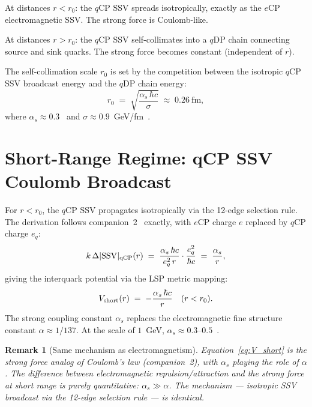 \documentclass[12pt]{article}
\newtheorem{remark}[theorem]{Remark}
\newcommand{\SSV}{\mathrm{SSV}}
\newcommand{\eCP}{e\mathrm{CP}}
\newcommand{\qCP}{q\mathrm{CP}}
\newcommand{\qDP}{q\mathrm{DP}}
\newcommand{\as}{\alpha_s}
\begin{document}
At distances $r < r_0$: the $\qCP$ SSV spreads isotropically,
exactly as the $\eCP$ electromagnetic SSV. The strong force is
Coulomb-like.

At distances $r > r_0$: the $\qCP$ SSV self-collimates into a
$\qDP$ chain connecting source and sink quarks. The strong force
becomes constant (independent of $r$).

The self-collimation scale $r_0$ is set by the competition between
the isotropic $\qCP$ SSV broadcast energy and the $\qDP$ chain
energy:
\begin{equation}
r_0 \;=\; \sqrt{\frac{\as\,\hbar c}{\sigma}}
\;\approx\; 0.26\ \mathrm{fm},
\label{eq:r0}
\end{equation}
where $\as \approx 0.3$~\cite{pdg2022} and $\sigma \approx 0.9$~GeV/fm~\cite{bali2001}.

\section{Short-Range Regime: qCP SSV Coulomb Broadcast}
\label{sec:short}

For $r < r_0$, the $\qCP$ SSV propagates isotropically via the
12-edge selection rule. The derivation follows companion~2~\cite{c2}
exactly, with $\eCP$ charge $e$ replaced by $\qCP$ charge $e_q$:
\begin{equation}
k\,\Delta|\SSV|_{\rm qCP}(r) \;=\; \frac{\as\,\hbar c}{e_q^2\,r}
\cdot \frac{e_q^2}{\hbar c}
\;=\; \frac{\as}{r},
\label{eq:ssv_short}
\end{equation}
giving the interquark potential via the LSP metric mapping:
\begin{equation}
V_{\rm short}(r) \;=\; -\frac{\as\,\hbar c}{r}
\quad (r < r_0).
\label{eq:V_short}
\end{equation}
The strong coupling constant $\as$ replaces the electromagnetic
fine structure constant $\alpha \approx 1/137$. At the scale of
$1$~GeV, $\as \approx 0.3$--$0.5$~\cite{pdg2022}.

\begin{remark}[Same mechanism as electromagnetism]
Equation~\eqref{eq:V_short} is the strong force analog of Coulomb's
law (companion~2), with $\as$ playing the role of $\alpha$. The
difference between electromagnetic repulsion/attraction and the
strong force at short range is purely quantitative: $\as \gg \alpha$.
The mechanism — isotropic SSV broadcast via the 12-edge selection
rule — is identical.
\end{remark}
\end{document}
